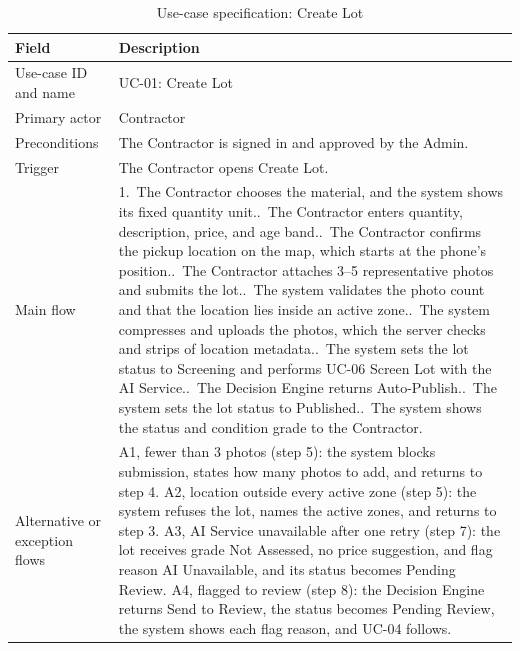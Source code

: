 \begin{table}[H]
\centering
\caption{Use-case specification: Create Lot}
\label{tab:uc-create-lot}
\footnotesize
\begin{tabularx}{\textwidth}{@{}p{}X@{}}
\toprule
\textbf{Field} & \textbf{Description} \\
\midrule
Use-case ID and name & UC-01: Create Lot \\
Primary actor & Contractor \\
Preconditions & The Contractor is signed in and approved by the Admin. \\
Trigger & The Contractor opens Create Lot. \\
Main flow & 1.~The Contractor chooses the material, and the system shows its fixed quantity unit.\newline
2.~The Contractor enters quantity, description, price, and age band.\newline
3.~The Contractor confirms the pickup location on the map, which starts at the phone's position.\newline
4.~The Contractor attaches 3--5 representative photos and submits the lot.\newline
5.~The system validates the photo count and that the location lies inside an active zone.\newline
6.~The system compresses and uploads the photos, which the server checks and strips of location metadata.\newline
7.~The system sets the lot status to Screening and performs UC-06 Screen Lot with the AI Service.\newline
8.~The Decision Engine returns Auto-Publish.\newline
9.~The system sets the lot status to Published.\newline
10.~The system shows the status and condition grade to the Contractor. \\
Alternative or exception flows & A1, fewer than 3 photos (step 5): the system blocks submission, states how many photos to add, and returns to step 4.\newline
A2, location outside every active zone (step 5): the system refuses the lot, names the active zones, and returns to step 3.\newline
A3, AI Service unavailable after one retry (step 7): the lot receives grade Not Assessed, no price suggestion, and flag reason AI Unavailable, and its status becomes Pending Review.\newline
A4, flagged to review (step 8): the Decision Engine returns Send to Review, the status becomes Pending Review, the system shows each flag reason, and UC-04 follows.\newline

\end{tabularx}
\end{table}
